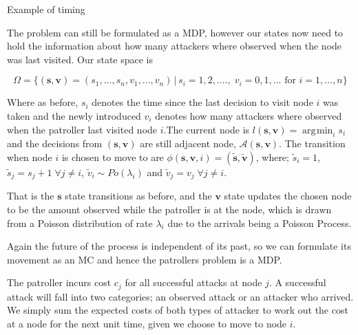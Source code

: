 \documentclass[a4paper,10pt]{article}
\DeclareMathOperator*{\argmin}{\arg\!\min}
\theoremstyle{definition}
\theoremstyle{definition}
\theoremstyle{remark}
\theoremstyle{definition}
\begin{document}
\begin{myfigure}
\begin{center}
\end{center}
\caption{Example of timing}
\end{myfigure}

The problem can still be formulated as a MDP, however our states now need to hold the information about how many attackers where observed when the node was last visited. Our state space is

$$\Omega= \{ (\bm{s},\bm{v})=(s_{1},...,s_{n},v_{1},...,v_{n}) \, | \, s_{i}=1,2,...., \; v_{i}=0,1,...  \text{ for } i=1,...,n\}$$

Where as before, $s_{i}$ denotes the time since the last decision to visit node $i$ was taken and the newly introduced $v_{i}$ denotes how many attackers where observed when the patroller last visited node $i$.The current node is $l(\bm{s},\bm{v})=\argmin_{i} s_{i}$ and the decisions from $(\bm{s},\bm{v})$ are still adjacent node, $\mathcal{A}(\bm{s},\bm{v})$. The transition when node $i$ is chosen to move to are $\phi(\bm{s},\bm{v},i)=(\widetilde{\bm{s}},\widetilde{\bm{v}})$, where; $\widetilde{s}_{i}=1$,  $\widetilde{s}_{j}=s_{j}+1 \; \forall j \neq i$, $\widetilde{v}_{i} \sim Po(\lambda_{i})$ and $\widetilde{v}_{j}=v_{j} \; \forall j \neq i$.

That is the $\bm{s}$ state transitions as before, and the $\bm{v}$ state updates the chosen node to be the amount observed while the patroller is at the node, which is drawn from a Poisson distribution of rate $\lambda_{i}$ due to the arrivals being a Poisson Process.

Again the future of the process is independent of its past, so we can formulate its movement as an MC and hence the patrollers problem is a MDP.

The patroller incurs cost $c_{j}$ for all successful attacks at node $j$. A successful attack will fall into two categories; an observed attack or an attacker who arrived. We simply sum the expected costs of both types of attacker to work out the cost at a node for the next unit time, given we choose to move to node $i$.
\end{document}

